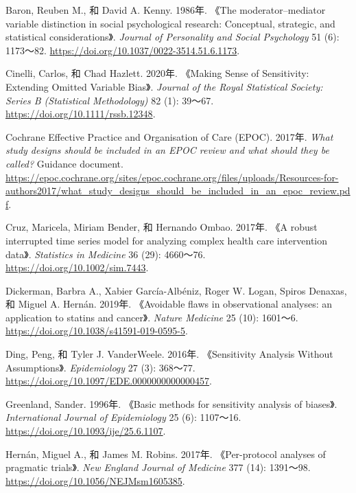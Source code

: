 \documentclass[
  chinese-hans,
  letterpaper,
  DIV=11,
  numbers=noendperiod]{scrreprt}
\newlength{\cslhangindent}
\newenvironment{CSLReferences}[2] %
 {\begin{list}{}{%
  \setlength{\itemindent}{0pt}
  \setlength{\leftmargin}{0pt}
  \setlength{\parsep}{0pt}
  \ifodd #1
   \setlength{\leftmargin}{\cslhangindent}
   \setlength{\itemindent}{-1\cslhangindent}
  \fi
  \setlength{\itemsep}{#2\baselineskip}}}
 {\end{list}}
\begin{document}

\protect{}\label{refs}
\begin{CSLReferences}{1}{1}
Baron, Reuben M., 和 David A. Kenny. 1986年. {《The moderator--mediator
variable distinction in social psychological research: Conceptual,
strategic, and statistical considerations》}. \emph{Journal of
Personality and Social Psychology} 51 (6): 1173～82.
\url{https://doi.org/10.1037/0022-3514.51.6.1173}.

Cinelli, Carlos, 和 Chad Hazlett. 2020年. {《Making Sense of
Sensitivity: Extending Omitted Variable Bias》}. \emph{Journal of the
Royal Statistical Society: Series B (Statistical Methodology)} 82 (1):
39～67. \url{https://doi.org/10.1111/rssb.12348}.

Cochrane Effective Practice and Organisation of Care (EPOC). 2017年.
\emph{What study designs should be included in an {EPOC} review and what
should they be called?} Guidance document.
\url{https://epoc.cochrane.org/sites/epoc.cochrane.org/files/uploads/Resources-for-authors2017/what_study_designs_should_be_included_in_an_epoc_review.pdf}.

Cruz, Maricela, Miriam Bender, 和 Hernando Ombao. 2017年. {《A robust
interrupted time series model for analyzing complex health care
intervention data》}. \emph{Statistics in Medicine} 36 (29): 4660～76.
\url{https://doi.org/10.1002/sim.7443}.

Dickerman, Barbra A., Xabier García-Albéniz, Roger W. Logan, Spiros
Denaxas, 和 Miguel A. Hernán. 2019年. {《Avoidable flaws in
observational analyses: an application to statins and cancer》}.
\emph{Nature Medicine} 25 (10): 1601～6.
\url{https://doi.org/10.1038/s41591-019-0595-5}.

Ding, Peng, 和 Tyler J. VanderWeele. 2016年. {《Sensitivity Analysis
Without Assumptions》}. \emph{Epidemiology} 27 (3): 368～77.
\url{https://doi.org/10.1097/EDE.0000000000000457}.

Greenland, Sander. 1996年. {《Basic methods for sensitivity analysis of
biases》}. \emph{International Journal of Epidemiology} 25 (6):
1107～16. \url{https://doi.org/10.1093/ije/25.6.1107}.

Hernán, Miguel A., 和 James M. Robins. 2017年. {《Per-protocol analyses
of pragmatic trials》}. \emph{New England Journal of Medicine} 377 (14):
1391～98. \url{https://doi.org/10.1056/NEJMsm1605385}.


\end{CSLReferences}
\end{document}
